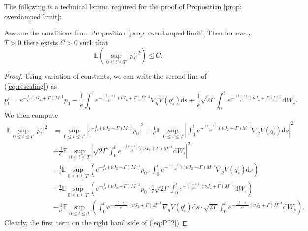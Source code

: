 The following is a technical lemma required for the proof of Proposition \ref{prop: overdamped limit}:
\begin{lemma}
	\label{lem:bounded p}Assume the conditions from Proposition \ref{prop: overdamped limit}.
	Then for every $T>0$ there exists $C>0$ such that 
	\[
	\mathbb{E} \left( \sup_{0\le t\le T}\vert p_{t}^{\epsilon}\vert^{2} \right) \le C.
	\]
	
\end{lemma}
\begin{proof}
	Using variation of constants, we can write the second line of (\ref{eq:rescaling})
	as 
	\[
	p_{t}^{\epsilon}=e^{-\frac{t}{\epsilon^{2}}(\nu J_{2}+\Gamma)M^{-1}}p_{0}-\frac{1}{\epsilon}\int_{0}^{t}e^{-\frac{(t-s)}{\epsilon^{2}}(\nu J_{2}+\Gamma)M^{-1}}\nabla_{q}V(q_{s}^{\epsilon})\mathrm{d}s+\frac{1}{\epsilon}\sqrt{2\Gamma}\int_{0}^{t}e^{-\frac{(t-s)}{\epsilon^{2}}(\nu J_{2}+\Gamma)M^{-1}}\mathrm{d}W_{s}.
	\]
	We then compute 
	\begin{align}
	\mathbb{E}\sup_{0\le t\le T}\vert p_{t}^{\epsilon}\vert^{2} & =\sup_{0\le t\le T}\left\lvert e^{-\frac{t}{\epsilon^{2}}(\nu J_{2}+\Gamma)M^{-1}}p_{0}\right\rvert^{2}+\frac{1}{\epsilon^{2}}\mathbb{E}\sup_{0\le t\le T}\left\lvert\int_{0}^{t}e^{-\frac{(t-s)}{\epsilon^{2}}(\nu J_{2}+\Gamma)M^{-1}}\nabla_{q}V(q_{s}^{\epsilon})\mathrm{d}s\right\rvert^{2}\nonumber \\
	& +\frac{1}{\epsilon^{2}}\mathbb{E}\sup_{0\le t\le T}\left\lvert\sqrt{2\Gamma}\int_{0}^{t}e^{-\frac{(t-s)}{\epsilon^{2}}(\nu J_{2}+\Gamma)M^{-1}}\mathrm{d}W_{s}\right\rvert^{2}\nonumber \\
	& -\frac{1}{\epsilon}\mathbb{E}\sup_{0\le t\le T}\left(e^{-\frac{t}{\epsilon^{2}}(\nu J_{2}+\Gamma)M^{-1}}p_{0}\cdot\int_{0}^{t}e^{-\frac{(t-s)}{\epsilon^{2}}(\nu J_{2}+\Gamma)M^{-1}}\nabla_{q}V(q_{s}^{\epsilon})\mathrm{d}s\right)\label{eq:P^2}\\
	& +\frac{1}{\epsilon}\mathbb{E}\sup_{0\le t\le T}\left(e^{-\frac{t}{\epsilon^{2}}(\nu J_{2}+\Gamma)M^{-1}}p_{0}\cdot\frac{1}{\epsilon}\sqrt{2\Gamma}\int_{0}^{t}e^{-\frac{(t-s)}{\epsilon^{2}}(\nu J_{2}+\Gamma)M^{-1}}\mathrm{d}W_{s}\right)\nonumber \\
	& -\frac{1}{\epsilon^{2}}\mathbb{E}\sup_{0\le t\le T}\left(\int_{0}^{t}e^{-\frac{(t-s)}{\epsilon^{2}}(\nu J_{2}+\Gamma)M^{-1}}\nabla_{q}V(q_{s}^{\epsilon})\mathrm{d}s\cdot\sqrt{2\Gamma}\int_{0}^{t}e^{-\frac{(t-s)}{\epsilon^{2}}(\nu J_{2}+\Gamma)M^{-1}}\mathrm{d}W_{s}\right).\nonumber 
	\end{align}
	Clearly, the first term on the right hand side of (\ref{eq:P^2})

\end{proof}
